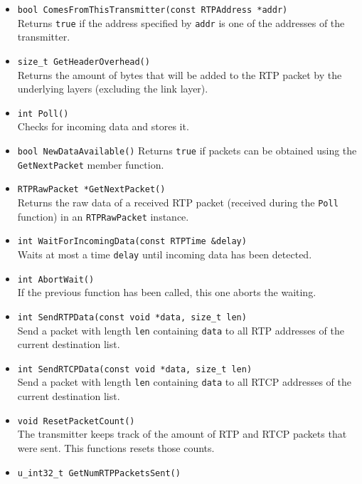 \documentclass[12pt,a4paper]{article}
\begin{document}
\begin{itemize}
						{\tt buffer} is not NULL-terminated. If the function fails because
						the buffer isn't large enough, it returns {\tt ERR\_RTP\_TRANS\_BUFFERLENGTHTOOSMALL}
						and stores the number of bytes needed in {\tt bufferlength}.
					\item {\tt bool ComesFromThisTransmitter(const RTPAddress *addr)}\\
						Returns {\tt true} if the address specified by {\tt addr} is one
						of the addresses of the transmitter. 
					\item {\tt size\_t GetHeaderOverhead()}\\
						Returns the amount of bytes that will be added to the RTP packet
						by the underlying layers (excluding the link layer).
					\item {\tt int Poll()}\\
						Checks for incoming data and stores it.
					\item {\tt bool NewDataAvailable()}
						Returns {\tt true} if packets can be obtained using the
						{\tt GetNextPacket} member function.
					\item {\tt RTPRawPacket *GetNextPacket()}\\
						Returns the raw data of a received RTP packet (received during
						the {\tt Poll} function) in an {\tt RTPRawPacket} instance.
					\item {\tt int WaitForIncomingData(const RTPTime \&delay)}\\
						Waits at most a time {\tt delay} until incoming data has
						been detected.
					\item {\tt int AbortWait()}\\
						If the previous function has been called, this one aborts
						the waiting.
					\item {\tt int SendRTPData(const void *data, size\_t len)}\\
						Send a packet with length {\tt len} containing {\tt data}
						to all RTP addresses of the current destination list.
					\item {\tt int SendRTCPData(const void *data, size\_t len)}\\
						Send a packet with length {\tt len} containing {\tt data}
						to all RTCP addresses of the current destination list.
					\item {\tt void ResetPacketCount()}\\
						The transmitter keeps track of the amount of RTP and RTCP 
						packets that were sent. This functions resets those counts.
					\item {\tt u\_int32\_t GetNumRTPPacketsSent()}\\

\end{itemize}
\end{document}
